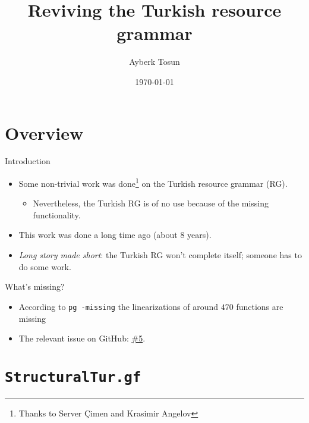 \documentclass{beamer}
\title{Reviving the Turkish resource grammar}
\date{\today}
\author{Ayberk Tosun}
\institute{Fifth GF Summer School}
\newcommand{\issuelink}{https://github.com/GrammaticalFramework/GF/pull/9}
\begin{document}
  \maketitle

  \section{Overview}

  \begin{frame}{Introduction}
    \begin{itemize}
      \item<1-> Some non-trivial work was done\footnote{Thanks to Server
        \c{C}imen and Krasimir Angelov} on the Turkish resource grammar (RG).
        \begin{itemize}
          \item<2-> Nevertheless, the Turkish RG is of no use
            because of the missing functionality.
        \end{itemize}
      \item<3-> This work was done a long time ago (about $8$ years).
      \item<4-> \emph{Long story made short}: the Turkish RG won't complete
        itself; someone has to do some work.
    \end{itemize}
  \end{frame}

  \begin{frame}{What's missing?}
    \begin{itemize}
      \item<1-> According to \texttt{pg -missing} the linearizations of around
        $470$ functions are missing
      \item<2-> The relevant issue on GitHub: \href{\issuelink}{\alert{\#5}}.
    \end{itemize}
  \end{frame}

  \section{\texttt{StructuralTur.gf}}
\end{document}
